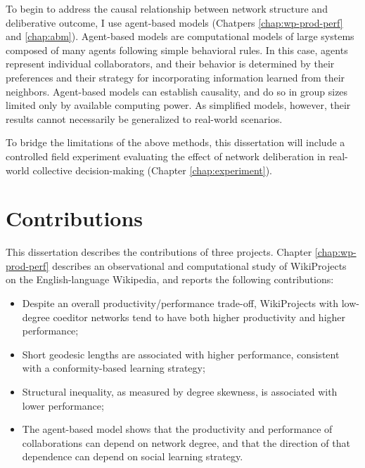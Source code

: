 To begin to address the causal relationship between network structure and
deliberative outcome, I use agent-based models
(Chatpers \ref{chap:wp-prod-perf} and \ref{chap:abm}).
Agent-based models are computational models of large systems composed of
many agents following simple behavioral rules.
In this case, agents represent individual collaborators,
and their behavior is determined by their preferences and their strategy for
incorporating information learned from their neighbors.
Agent-based models can establish causality,
and do so in group sizes limited only by available computing power.
As simplified models, however, their results cannot necessarily be generalized
to real-world scenarios.

To bridge the limitations of the above methods,
this dissertation will include a controlled field experiment evaluating the
effect of network deliberation in real-world collective decision-making
(Chapter \ref{chap:experiment}).

\section{Contributions}
This dissertation describes the contributions of three projects.
Chapter \ref{chap:wp-prod-perf} describes an observational and computational
study of WikiProjects on the English-language Wikipedia,
and reports the following contributions:
\begin{itemize}
\setlength\itemsep{0pt}
\item Despite an overall productivity/performance trade-off,
WikiProjects with low-degree coeditor networks tend to have both higher
productivity and higher performance;
\item Short geodesic lengths are associated with higher performance,
consistent with a conformity-based learning strategy;
\item Structural inequality, as measured by degree skewness,
is associated with lower performance;
\item The agent-based model shows that the productivity and performance of
collaborations can depend on network degree,
and that the direction of that dependence can depend on social learning strategy.
\end{itemize}

